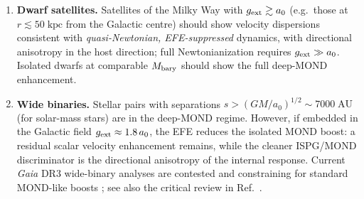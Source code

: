 \documentclass[11pt]{article}
\begin{document}
\begin{enumerate}
  \item \textbf{Dwarf satellites.}  Satellites of the Milky Way
    with $g_{\rm ext} \gtrsim a_0$ (e.g.\ those at
    $r \lesssim 50\;\mathrm{kpc}$ from the Galactic centre) should
    show velocity dispersions consistent with \emph{quasi-Newtonian,
    EFE-suppressed} dynamics, with directional anisotropy in the host
    direction; full Newtonianization requires $g_{\rm ext}\gg a_0$.
    Isolated dwarfs at comparable $M_{\rm bary}$ should show the full
    deep-MOND enhancement.
  \item \textbf{Wide binaries.}  Stellar pairs with separations
    $s > (GM/a_0)^{1/2} \sim 7000\;\mathrm{AU}$ (for solar-mass
    stars) are in the deep-MOND regime.  However, if embedded in
    the Galactic field $g_{\rm ext} \approx 1.8\,a_0$, the EFE
    reduces the isolated MOND boost: a residual scalar velocity
    enhancement remains, while the cleaner ISPG/MOND discriminator is
    the directional anisotropy of the internal response.  Current
    \emph{Gaia} DR3 wide-binary analyses are contested and
    constraining for standard MOND-like boosts
    \cite{Banik2024GaiaWB,Pittordis2025GaiaWB}; see also the critical
    review in Ref.~\cite{Hernandez2024GaiaWB}.


\end{enumerate}
\end{document}
